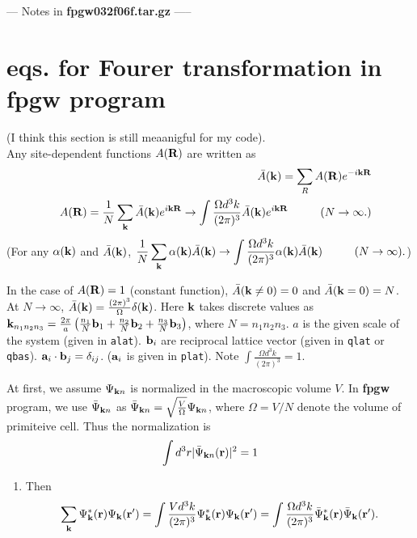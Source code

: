 \documentclass[a4paper,10pt,epsf,fleqn]{article}
\newcommand{\bfk}{{\bf k}}
\newcommand{\bfr}{{\bf r}}
\newcommand{\bfR}{{\bf R}}
\newcommand{\bfa}{{\bf a}}
\newcommand{\bfb}{{\bf b}}
\begin{document}
{{{%
\newpage
{\huge --- Notes in {\bf fpgw032f06f.tar.gz} -----}
\section{eqs. for Fourer transformation in {\bf fpgw} program}

(I think this section is still meaanigful for my code).\\

Any site-dependent functions $A(\bfR)$ are written as
\begin{eqnarray}
&& \bar{A}(\bfk) = \sum_{R} A(\bfR) e^{-i \bfk \bfR} \\
&& A(\bfR) = \frac{1}{N} \sum_{\bfk} \bar{A}(\bfk) e^{i \bfk \bfR}
\rightarrow \int \frac{\Omega d^3 k  }{(2 \pi)^3} \bar{A}(\bfk) e^{i \bfk \bfR} 
\hspace{1cm}(N \to \infty.) 
\end{eqnarray}
(For any $\alpha(\bfk)$ and $\bar{A}(\bfk)$, 
$ \displaystyle
\frac{1}{N} \sum_{\bfk} \alpha(\bfk) \bar{A}(\bfk) 
\rightarrow \int \frac{\Omega d^3 k  }{(2 \pi)^3} 
\alpha(\bfk) \bar{A}(\bfk) \hspace{1cm}(N \to \infty).
$)

In the case of $A(\bfR)=1$ (constant function), 
$\bar{A}(\bfk\ne0) = 0$ and $\bar{A}(\bfk=0) = N$.
At $N \to \infty$, 
$\bar{A}(\bfk) = \frac{(2 \pi)^3}{\Omega} \delta(\bfk)$.
Here $\bfk$ takes discrete values as 
$\bfk_{n_1 n_2 n_3}= \frac{2 \pi}{a}
\left( \frac{n_1}{N} \bfb_1 +\frac{n_2}{N} \bfb_2 +\frac{n_3}{N} \bfb_3 \right)$, 
where $N=n_1 n_2 n_3$.
$a$ is the given scale of the system (given in {\tt alat}).
$\bfb_i$ are reciprocal lattice vector (given in {\tt qlat} or {\tt qbas}). 
$ \bfa_i \cdot \bfb_j =\delta_{ij}$. ($ \bfa_i$ is given in {\tt plat}).
Note $\int \frac{ \Omega d^3 k }{(2 \pi)^3} =1$.


At first, we assume $\Psi_{\bfk n}$ is normalized in the macroscopic volume $V$. 
In {\bf fpgw} program, we use $\bar\Psi_{\bfk n}$ as
$\bar{\Psi}_{\bfk n}= \sqrt{\frac{V}{\Omega}} {\Psi}_{\bfk n}$,
where $\Omega=V/N$ denote the volume of primiteive cell.
Thus the normalization is
\begin{eqnarray}
\int d^3 r  |\bar{\Psi}_{\bfk n}(\bfr)|^2 =1
\end{eqnarray}

\begin{enumerate}
\item
Then
\begin{eqnarray}
 \sum_{\bfk} \Psi^*_{\bfk}(\bfr) {\Psi}_{\bfk} (\bfr')
= \int \frac{V d^3 k  }{(2 \pi)^3}
\Psi^*_{\bfk}(\bfr) {\Psi}_{\bfk} (\bfr')
= \int \frac{\Omega d^3 k }{(2 \pi)^3}
\bar{\Psi}^*_{\bfk}(\bfr) \bar{\Psi}_{\bfk} (\bfr').
\end{eqnarray}


\end{enumerate}}}}
\end{document}
